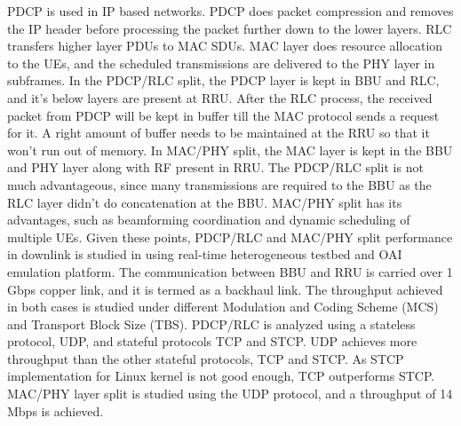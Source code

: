 \begin{multicols}{2}
\begin{itemize}
PDCP is used in IP based networks. PDCP does packet compression and removes the IP header before processing the packet further down to the lower layers. RLC transfers higher layer PDUs to MAC SDUs. MAC layer does resource allocation to the UEs, and the scheduled transmissions are delivered to the PHY layer in subframes. In the PDCP/RLC split, the PDCP layer is kept in BBU and RLC, and it’s below layers are present at RRU. After the RLC process, the received packet from PDCP will be kept in buffer till the MAC protocol sends a request for it. A right amount of buffer needs to be maintained at the RRU so that it won’t run out of memory. In MAC/PHY split, the MAC layer is kept in the BBU and PHY layer along with RF present in RRU. The PDCP/RLC split is not much advantageous, since many transmissions are required to the BBU as the RLC layer didn’t do concatenation at the BBU. MAC/PHY split has its advantages, such as beamforming coordination and dynamic scheduling of multiple UEs. Given these points, PDCP/RLC and MAC/PHY split performance in downlink is studied in \cite{art3-key77} using real-time heterogeneous testbed and OAI emulation platform. The communication between BBU and RRU is carried over 1 Gbps copper link, and it is termed as a backhaul link. The throughput achieved in both cases is studied under different Modulation and Coding Scheme (MCS) and Transport Block Size (TBS). PDCP/RLC is analyzed using a stateless protocol, UDP, and stateful protocols TCP and STCP. UDP achieves more throughput than the other stateful protocols, TCP and STCP. As STCP implementation for Linux kernel is not good enough, TCP outperforms STCP. MAC/PHY layer split is studied using the UDP protocol, and a throughput of 14 Mbps is achieved. 


\end{itemize}
\end{multicols}
